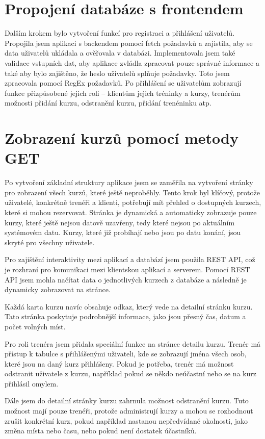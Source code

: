 \documentclass[12pt, a4paper,
twoside,        %
openany
]{report}
\begin{document}
       \clearpage
\section {Propojení databáze s frontendem}
Dalším krokem bylo vytvoření funkcí pro registraci a přihlášení uživatelů. Propojila jsem aplikaci s backendem pomocí fetch požadavků a zajistila, aby se data uživatelů ukládala a ověřovala v databázi. Implementovala jsem také validace vstupních dat, aby aplikace zvládla zpracovat pouze správné informace a také aby bylo zajištěno, že heslo uživatelů splňuje požadavky. Toto jsem zpracovala pomocí RegEx požadavků. Po přihlášení se uživatelům zobrazují funkce přizpůsobené jejich roli – klientům jejich tréninky a kurzy, trenérům možnosti přidání kurzu, odstranění kurzu, přidání trenéninku atp.

\section{Zobrazení kurzů pomocí metody GET}
Po vytvoření základní struktury aplikace jsem se zaměřila na vytvoření stránky pro zobrazení všech kurzů, které ještě neproběhly. Tento krok byl klíčový, protože uživatelé, konkrétně trenéři a klienti, potřebují mít přehled o dostupných kurzech, které si mohou rezervovat. Stránka je dynamická a automaticky zobrazuje pouze kurzy, které ještě nejsou datově uzavřeny, tedy které nejsou po aktuálním systémovém datu. Kurzy, které již probíhají nebo jsou po datu konání, jsou skryté pro všechny uživatele.

Pro zajištění interaktivity mezi aplikací a databází jsem použila REST API, což je rozhraní pro komunikaci mezi klientskou aplikací a serverem. Pomocí REST API jsem mohla načítat data o jednotlivých kurzech z databáze a následně je dynamicky zobrazovat na stránce. 

Každá karta kurzu navíc obsahuje odkaz, který vede na detailní stránku kurzu. Tato stránka poskytuje podrobnější informace, jako jsou přesný čas, datum a počet volných míst. 

Pro roli trenéra jsem přidala speciální funkce na stránce detailu kurzu. Trenér má přístup k tabulce s přihlášenými uživateli, kde se zobrazují jména všech osob, které jsou na daný kurz přihlášeny.
Pokud je potřeba, trenér má možnost odstranit uživatele z kurzu, například pokud se někdo neúčastní nebo se na kurz přihlásil omylem.

Dále jsem do detailní stránky kurzu zahrnula možnost odstranění kurzu. Tuto možnost mají pouze trenéři, protože administrují kurzy a mohou se rozhodnout zrušit konkrétní kurz, pokud například nastanou nepředvídané okolnosti, jako změna místa nebo času, nebo pokud není dostatek účastníků.
\end{document}
